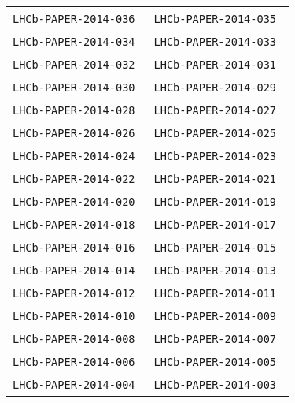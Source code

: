 \begin{center}
\begin{longtable}{ll}
\texttt{LHCb-PAPER-2014-036}~\cite{LHCb-PAPER-2014-036} &
\texttt{LHCb-PAPER-2014-035}~\cite{LHCb-PAPER-2014-035} \\
\texttt{LHCb-PAPER-2014-034}~\cite{LHCb-PAPER-2014-034} &
\texttt{LHCb-PAPER-2014-033}~\cite{LHCb-PAPER-2014-033} \\
\texttt{LHCb-PAPER-2014-032}~\cite{LHCb-PAPER-2014-032} &
\texttt{LHCb-PAPER-2014-031}~\cite{LHCb-PAPER-2014-031} \\
\texttt{LHCb-PAPER-2014-030}~\cite{LHCb-PAPER-2014-030} &
\texttt{LHCb-PAPER-2014-029}~\cite{LHCb-PAPER-2014-029} \\
\texttt{LHCb-PAPER-2014-028}~\cite{LHCb-PAPER-2014-028} &
\texttt{LHCb-PAPER-2014-027}~\cite{LHCb-PAPER-2014-027} \\
\texttt{LHCb-PAPER-2014-026}~\cite{LHCb-PAPER-2014-026} &
\texttt{LHCb-PAPER-2014-025}~\cite{LHCb-PAPER-2014-025} \\
\texttt{LHCb-PAPER-2014-024}~\cite{LHCb-PAPER-2014-024} &
\texttt{LHCb-PAPER-2014-023}~\cite{LHCb-PAPER-2014-023} \\
\texttt{LHCb-PAPER-2014-022}~\cite{LHCb-PAPER-2014-022} &
\texttt{LHCb-PAPER-2014-021}~\cite{LHCb-PAPER-2014-021} \\
\texttt{LHCb-PAPER-2014-020}~\cite{LHCb-PAPER-2014-020} &
\texttt{LHCb-PAPER-2014-019}~\cite{LHCb-PAPER-2014-019} \\
\texttt{LHCb-PAPER-2014-018}~\cite{LHCb-PAPER-2014-018} &
\texttt{LHCb-PAPER-2014-017}~\cite{LHCb-PAPER-2014-017} \\
\texttt{LHCb-PAPER-2014-016}~\cite{LHCb-PAPER-2014-016} &
\texttt{LHCb-PAPER-2014-015}~\cite{LHCb-PAPER-2014-015} \\
\texttt{LHCb-PAPER-2014-014}~\cite{LHCb-PAPER-2014-014} &
\texttt{LHCb-PAPER-2014-013}~\cite{LHCb-PAPER-2014-013} \\
\texttt{LHCb-PAPER-2014-012}~\cite{LHCb-PAPER-2014-012} &
\texttt{LHCb-PAPER-2014-011}~\cite{LHCb-PAPER-2014-011} \\
\texttt{LHCb-PAPER-2014-010}~\cite{LHCb-PAPER-2014-010} &
\texttt{LHCb-PAPER-2014-009}~\cite{LHCb-PAPER-2014-009} \\
\texttt{LHCb-PAPER-2014-008}~\cite{LHCb-PAPER-2014-008} &
\texttt{LHCb-PAPER-2014-007}~\cite{LHCb-PAPER-2014-007} \\
\texttt{LHCb-PAPER-2014-006}~\cite{LHCb-PAPER-2014-006} &
\texttt{LHCb-PAPER-2014-005}~\cite{LHCb-PAPER-2014-005} \\
\texttt{LHCb-PAPER-2014-004}~\cite{LHCb-PAPER-2014-004} &
\texttt{LHCb-PAPER-2014-003}~\cite{LHCb-PAPER-2014-003} \\

\end{longtable}
\end{center}
